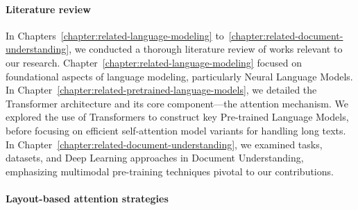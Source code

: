 

\paragraph{Literature review}

In Chapters~\ref{chapter:related-language-modeling} to~\ref{chapter:related-document-understanding}, we conducted a thorough literature review of works relevant to our research. Chapter~\ref{chapter:related-language-modeling} focused on foundational aspects of language modeling, particularly Neural Language Models. In Chapter~\ref{chapter:related-pretrained-language-models}, we detailed the Transformer architecture and its core component—the attention mechanism. We explored the use of Transformers to construct key Pre-trained Language Models, before focusing on efficient self-attention model variants for handling long texts. In Chapter~\ref{chapter:related-document-understanding}, we examined tasks, datasets, and Deep Learning approaches in Document Understanding, emphasizing multimodal pre-training techniques pivotal to our contributions.
 
\paragraph{Layout-based attention strategies}

